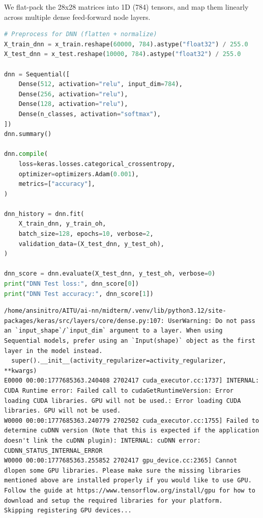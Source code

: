 We flat-pack the 28x28 matrices into 1D (784) tensors, and map them
linearly across multiple dense feed-forward node layers.

\begin{lstlisting}[language=Python]
# Preprocess for DNN (flatten + normalize)
X_train_dnn = x_train.reshape(60000, 784).astype("float32") / 255.0
X_test_dnn = x_test.reshape(10000, 784).astype("float32") / 255.0

dnn = Sequential([
    Dense(512, activation="relu", input_dim=784),
    Dense(256, activation="relu"),
    Dense(128, activation="relu"),
    Dense(n_classes, activation="softmax"),
])
dnn.summary()

dnn.compile(
    loss=keras.losses.categorical_crossentropy,
    optimizer=optimizers.Adam(0.001),
    metrics=["accuracy"],
)

dnn_history = dnn.fit(
    X_train_dnn, y_train_oh,
    batch_size=128, epochs=10, verbose=2,
    validation_data=(X_test_dnn, y_test_oh),
)

dnn_score = dnn.evaluate(X_test_dnn, y_test_oh, verbose=0)
print("DNN Test loss:", dnn_score[0])
print("DNN Test accuracy:", dnn_score[1])
\end{lstlisting}

\begin{lstlisting}
/home/ansinitro/AITU/ai-nn/midterm/.venv/lib/python3.12/site-packages/keras/src/layers/core/dense.py:107: UserWarning: Do not pass an `input_shape`/`input_dim` argument to a layer. When using Sequential models, prefer using an `Input(shape)` object as the first layer in the model instead.
  super().__init__(activity_regularizer=activity_regularizer, **kwargs)
E0000 00:00:1777685363.240408 2702417 cuda_executor.cc:1737] INTERNAL: CUDA Runtime error: Failed call to cudaGetRuntimeVersion: Error loading CUDA libraries. GPU will not be used.: Error loading CUDA libraries. GPU will not be used.
W0000 00:00:1777685363.240779 2702502 cuda_executor.cc:1755] Failed to determine cuDNN version (Note that this is expected if the application doesn't link the cuDNN plugin): INTERNAL: cuDNN error: CUDNN_STATUS_INTERNAL_ERROR
W0000 00:00:1777685363.255852 2702417 gpu_device.cc:2365] Cannot dlopen some GPU libraries. Please make sure the missing libraries mentioned above are installed properly if you would like to use GPU. Follow the guide at https://www.tensorflow.org/install/gpu for how to download and setup the required libraries for your platform.
Skipping registering GPU devices...
\end{lstlisting}

